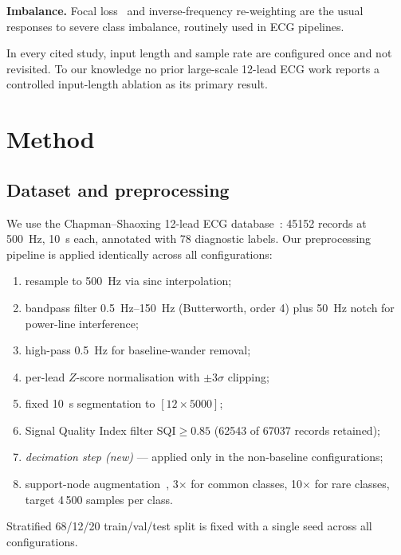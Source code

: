 \documentclass[conference]{IEEEtran}
\begin{document}
\textbf{Imbalance.} Focal loss~\cite{lin2017} and inverse-frequency
re-weighting are the usual responses to severe class imbalance, routinely
used in ECG pipelines.

In every cited study, input length and sample rate are configured once and
not revisited. To our knowledge no prior large-scale 12-lead ECG work
reports a controlled input-length ablation as its primary result.

\section{Method}

\subsection{Dataset and preprocessing}
We use the Chapman--Shaoxing 12-lead ECG database~\cite{zheng2020}:
\num{45152} records at \SI{500}{\hertz}, \SI{10}{\second} each, annotated
with \num{78} diagnostic labels. Our preprocessing pipeline is applied
identically across all configurations:
\begin{enumerate}
  \item resample to \SI{500}{\hertz} via sinc interpolation;
  \item bandpass filter \SIrange{0.5}{150}{\hertz} (Butterworth, order 4)
        plus \SI{50}{\hertz} notch for power-line interference;
  \item high-pass \SI{0.5}{\hertz} for baseline-wander removal;
  \item per-lead $Z$-score normalisation with $\pm3\sigma$ clipping;
  \item fixed \SI{10}{\second} segmentation to $[12\times 5000]$;
  \item Signal Quality Index filter SQI${} \geq \num{0.85}$
        (\num{62543} of \num{67037} records retained);
  \item \emph{decimation step (new)} --- applied only in the non-baseline
        configurations;
  \item support-node augmentation~\cite{xu2022}, 3$\times$ for common
        classes, 10$\times$ for rare classes, target 4\,500 samples per
        class.
\end{enumerate}
Stratified 68/12/20 train/val/test split is fixed with a single seed
across all configurations.
\end{document}
